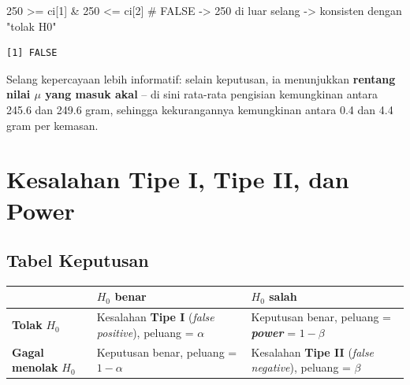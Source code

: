 \documentclass[
  indonesian,
  letterpaper,
]{book}
\newenvironment{Shaded}{\begin{snugshade}}{\end{snugshade}}
\newcommand{\CommentTok}[1]{\textcolor[rgb]{0.37,0.37,0.37}{#1}}
\newcommand{\DecValTok}[1]{\textcolor[rgb]{0.68,0.00,0.00}{#1}}
\newcommand{\NormalTok}[1]{\textcolor[rgb]{0.00,0.23,0.31}{#1}}
\newcommand{\SpecialCharTok}[1]{\textcolor[rgb]{0.37,0.37,0.37}{#1}}
\newcounter{none} %
\begin{document}
\begin{Shaded}
\begin{Highlighting}[]
\DecValTok{250} \SpecialCharTok{\textgreater{}=}\NormalTok{ ci[}\DecValTok{1}\NormalTok{] }\SpecialCharTok{\&} \DecValTok{250} \SpecialCharTok{\textless{}=}\NormalTok{ ci[}\DecValTok{2}\NormalTok{]   }\CommentTok{\# FALSE {-}\textgreater{} 250 di luar selang {-}\textgreater{} konsisten dengan "tolak H0"}
\end{Highlighting}
\end{Shaded}

\begin{verbatim}
[1] FALSE
\end{verbatim}

Selang kepercayaan lebih informatif: selain keputusan, ia menunjukkan
\textbf{rentang nilai \(\mu\) yang masuk akal} -- di sini rata-rata
pengisian kemungkinan antara 245.6 dan 249.6 gram, sehingga
kekurangannya kemungkinan antara 0.4 dan 4.4 gram per kemasan.

\section{Kesalahan Tipe I, Tipe II, dan
Power}\label{kesalahan-tipe-i-tipe-ii-dan-power}

\subsection{Tabel Keputusan}\label{tabel-keputusan}

{\def\LTcaptype{none} %
\begin{longtable}[]{@{}
  >{\raggedright\arraybackslash}p{}
  >{\raggedright\arraybackslash}p{}
  >{\raggedright\arraybackslash}p{}@{}}
\toprule\noalign{}
\begin{minipage}[b]{\linewidth}\raggedright
\end{minipage} & \begin{minipage}[b]{\linewidth}\raggedright
\textbf{\(H_0\) benar}
\end{minipage} & \begin{minipage}[b]{\linewidth}\raggedright
\textbf{\(H_0\) salah}
\end{minipage} \\
\midrule\noalign{}
\endhead
\bottomrule\noalign{}
\endlastfoot
\textbf{Tolak} \(H_0\) & Kesalahan \textbf{Tipe I} (\emph{false
positive}), peluang = \(\alpha\) & Keputusan benar, peluang =
\textbf{\emph{power}} = \(1 - \beta\) \\
\textbf{Gagal menolak} \(H_0\) & Keputusan benar, peluang =
\(1 - \alpha\) & Kesalahan \textbf{Tipe II} (\emph{false negative}),
peluang = \(\beta\) \\
\end{longtable}
}
\end{document}
